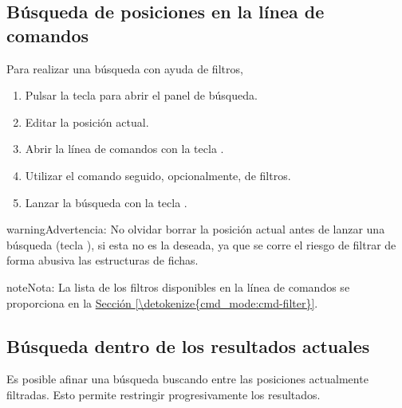 \documentclass[letterpaper,10pt,spanish]{sphinxmanual}
\begin{document}
\subsection{Búsqueda de posiciones en la línea de comandos}
\label{\detokenize{annexe_filtres:recherche-de-positions-en-ligne-de-commande}}
\sphinxAtStartPar
Para realizar una búsqueda con ayuda de filtros,
\begin{enumerate}
%
\item {} 
\sphinxAtStartPar
Pulsar la tecla  para abrir el panel de búsqueda.

\item {} 
\sphinxAtStartPar
Editar la posición actual.

\item {} 
\sphinxAtStartPar
Abrir la línea de comandos con la tecla .

\item {} 
\sphinxAtStartPar
Utilizar el comando  seguido, opcionalmente, de filtros.

\item {} 
\sphinxAtStartPar
Lanzar la búsqueda con la tecla .

\end{enumerate}

\begin{sphinxadmonition}{warning}{Advertencia:}
\sphinxAtStartPar
No olvidar borrar la posición actual antes de lanzar una búsqueda (tecla ), si esta no es la deseada, ya que se corre el riesgo de filtrar de forma abusiva las estructuras de fichas.
\end{sphinxadmonition}

\begin{sphinxadmonition}{note}{Nota:}
\sphinxAtStartPar
La lista de los filtros disponibles en la línea de comandos se proporciona en la \hyperref[\detokenize{cmd_mode:cmd-filter}]{Sección \ref{\detokenize{cmd_mode:cmd-filter}}}.
\end{sphinxadmonition}


\subsection{Búsqueda dentro de los resultados actuales}
\label{\detokenize{annexe_filtres:recherche-dans-les-resultats-courants}}
\sphinxAtStartPar
Es posible afinar una búsqueda buscando entre las posiciones actualmente filtradas. Esto permite restringir progresivamente los resultados.
\end{document}
